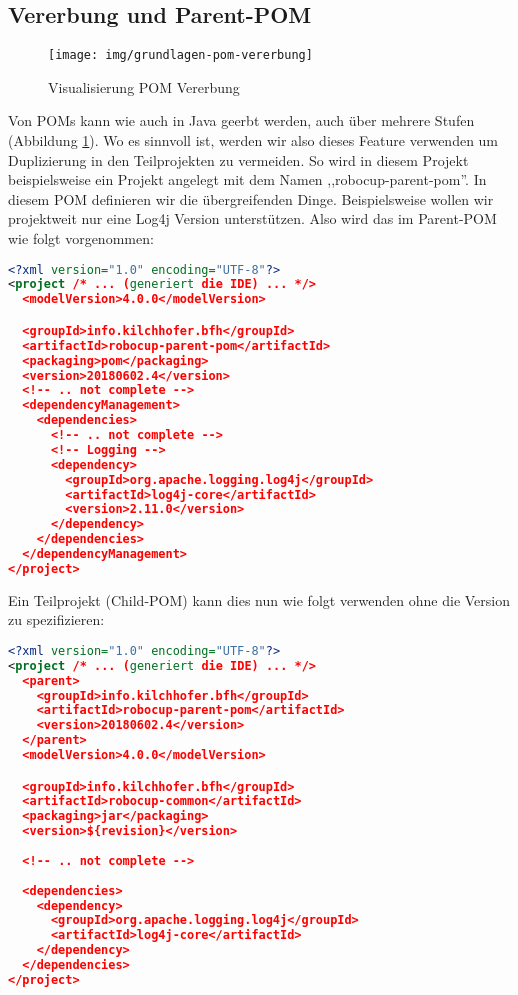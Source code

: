 \subsection{Vererbung und Parent-POM}
\begin{figure}[H]
	\centering
	\texttt{[image: img/grundlagen-pom-vererbung]}
	\caption{Visualisierung POM Vererbung}
	\label{fig:grundlagen-pom-vererbung}
\end{figure}
Von POMs kann wie auch in Java geerbt werden, auch über mehrere Stufen (Abbildung \ref{fig:grundlagen-pom-vererbung}). Wo es sinnvoll ist, werden wir also dieses Feature verwenden um Duplizierung in den Teilprojekten zu vermeiden. So wird in diesem Projekt beispielsweise ein Projekt angelegt mit dem Namen ,,robocup-parent-pom''. In diesem POM definieren wir die übergreifenden Dinge. Beispielsweise wollen wir projektweit nur eine Log4j Version unterstützen. Also wird das im Parent-POM wie folgt vorgenommen:
\begin{lstlisting}[language=XML, caption={Ausschnitt aus dem Parent-POM},label={lst:maven-parent-pom}]
<?xml version="1.0" encoding="UTF-8"?>
<project /* ... (generiert die IDE) ... */>
  <modelVersion>4.0.0</modelVersion>

  <groupId>info.kilchhofer.bfh</groupId>
  <artifactId>robocup-parent-pom</artifactId>
  <packaging>pom</packaging>
  <version>20180602.4</version>
  <!-- .. not complete -->
  <dependencyManagement>
    <dependencies>
      <!-- .. not complete -->
      <!-- Logging -->
      <dependency>
        <groupId>org.apache.logging.log4j</groupId>
        <artifactId>log4j-core</artifactId>
        <version>2.11.0</version>
      </dependency>
    </dependencies>
  </dependencyManagement>
</project>
\end{lstlisting}

Ein Teilprojekt (Child-POM) kann dies nun wie folgt verwenden ohne die Version zu spezifizieren:
\begin{lstlisting}[language=XML, caption={Ausschnitt aus dem Child-POM},label={lst:maven-child-pom}]
<?xml version="1.0" encoding="UTF-8"?>
<project /* ... (generiert die IDE) ... */>
  <parent>
    <groupId>info.kilchhofer.bfh</groupId>
    <artifactId>robocup-parent-pom</artifactId>
    <version>20180602.4</version>
  </parent>
  <modelVersion>4.0.0</modelVersion>

  <groupId>info.kilchhofer.bfh</groupId>
  <artifactId>robocup-common</artifactId>
  <packaging>jar</packaging>
  <version>${revision}</version>
  
  <!-- .. not complete -->
      
  <dependencies>
    <dependency>
      <groupId>org.apache.logging.log4j</groupId>
      <artifactId>log4j-core</artifactId>
    </dependency>
  </dependencies>
</project>
\end{lstlisting}

